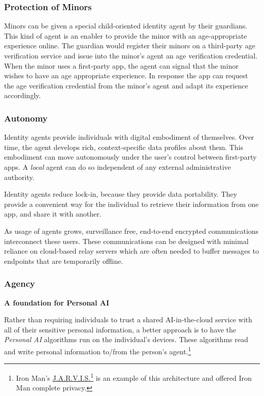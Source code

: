 \documentclass[11pt, oneside]{article}   	%
\newcommand{\hyperfootnote}[1][]{\def\ArgI{{#1}}\hyperfootnoteRelay}
\newcommand\hyperfootnoteRelay[2][]{\href{#1#2}{\ArgI}\footnote{\href{#1#2}{#2}}}
\begin{document}
\subsubsection{Protection of Minors}

Minors can be given a special child-oriented identity agent by their guardians. This kind of agent is an enabler to  provide the minor with an age-appropriate experience online. The guardian would register their minors on a third-party age verification service and issue into the minor's agent an age verification credential. When the minor uses a first-party app, the agent can signal that the minor wishes to have an age appropriate experience. In response the app can request the age verification credential from the minor's agent and adapt its experience accordingly.

\subsubsection{Autonomy}

Identity agents provide individuals with digital embodiment of themselves. Over time, the agent develops rich, context-specific data profiles about them. This embodiment can move autonomously under the user's control between first-party apps. A \emph{local} agent can do so independent of any external administrative authority. 

Identity agents reduce lock-in, because they provide data portability. They provide a convenient way for the individual to retrieve their information from one app, and share it with another. 

As usage of agents grows, surveillance free, end-to-end encrypted communications interconnect these users. These communications can be designed with minimal reliance on cloud-based relay servers which are often needed to buffer messages to endpoints that are temporarily offline.

\subsubsection{Agency}

\textbf{A foundation for Personal AI}

Rather than requiring individuals to trust a shared AI-in-the-cloud service with all of their sensitive personal information, a better approach is to have the \emph{Personal AI} algorithms run on the individual's devices. These algorithms read and write personal information to/from the person's agent.\footnote{Iron Man's \hyperfootnote[J.A.R.V.I.S.][https://]{en.wikipedia.org/wiki/J.A.R.V.I.S.} is an example of this architecture and offered Iron Man complete privacy.}
\end{document}
